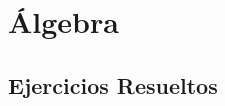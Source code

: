 \documentclass[12pt,a4paper]{book}
\begin{document}
\chapter{Álgebra}

\section{Ejercicios Resueltos}




\end{document}
